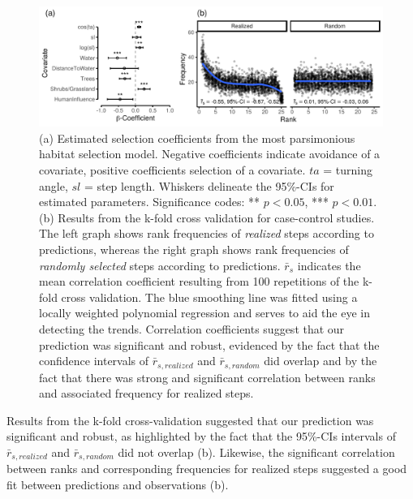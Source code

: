 \documentclass[abstract=on,10pt,a4paper,bibliography=totocnumbered]{article}
\begin{document}
\begin{figure}[h]
  \begin{center}
    \includegraphics[width = \textwidth]{99_PermeabilityResults.pdf}
    \caption{(a) Estimated selection coefficients from the most parsimonious
    habitat selection model. Negative coefficients indicate avoidance of a
    covariate, positive coefficients selection of a covariate. \(ta\) = turning
    angle, \(sl\) = step length. Whiskers delineate the 95\%-CIs for estimated
    parameters. Significance codes: ** \(p < 0.05\), *** \(p < 0.01\). (b)
    Results from the k-fold cross validation for case-control studies. The left
    graph shows rank frequencies of \textit{realized} steps according to
    predictions, whereas the right graph shows rank frequencies of
    \textit{randomly selected} steps according to predictions. \(\bar{r}_s\)
    indicates the mean correlation coefficient resulting from 100 repetitions of
    the k-fold cross validation. The blue smoothing line was fitted using a
    locally weighted polynomial regression and serves to aid the eye in
    detecting the trends. Correlation coefficients suggest that our prediction
    was significant and robust, evidenced by the fact that the confidence
    intervals of \(\bar{r}_{s, realized}\) and \(\bar{r}_{s, random}\) did
    overlap and by the fact that there was strong and significant correlation
    between ranks and associated frequency for realized steps.}
    \label{PermeabilityResults}
  \end{center}
\end{figure}

Results from the k-fold cross-validation suggested that our prediction was
significant and robust, as highlighted by the fact that the 95\%-CIs intervals
of \(\bar{r}_{s, realized}\) and \(\bar{r}_{s, random}\) did not overlap
(b). Likewise, the significant correlation between
ranks and corresponding frequencies for realized steps suggested a good fit
between predictions and observations (b).
\end{document}
